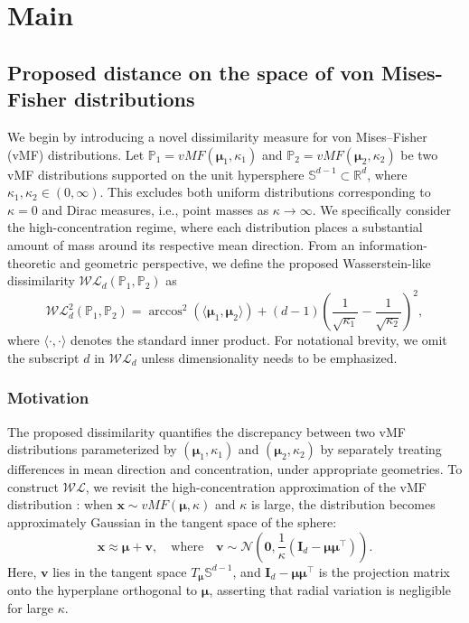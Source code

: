 \documentclass[10pt]{article}
\newcommand{\bfv}{\boldsymbol{v}}
\newcommand{\bfx}{\boldsymbol{x}}
\newcommand{\bfmu}{\boldsymbol{\mu}}
\newcommand{\bfI}{\boldsymbol{I}}
\newcommand{\bbP}{\mathbb{P}}
\newcommand{\bbR}{\mathbb{R}}
\newcommand{\bbS}{\mathbb{S}}
\newcommand{\calN}{\mathcal{N}}
\newcommand{\WL}{\mathcal{WL}}
\begin{document}
\section{Main}
\subsection{Proposed distance on the space of von Mises-Fisher distributions}

We begin by introducing a novel dissimilarity measure for von Mises–Fisher (vMF) distributions. Let $\bbP_1 = vMF(\bfmu_1, \kappa_1)$ and $\bbP_2 = vMF(\bfmu_2, \kappa_2)$ be two vMF distributions supported on the unit hypersphere $\bbS^{d-1} \subset \bbR^d$, where $\kappa_1, \kappa_2 \in (0, \infty)$. This excludes both uniform distributions corresponding to $\kappa=0$ and Dirac measures, i.e., point masses as $\kappa \to \infty$. We specifically consider the high-concentration regime, where each distribution places a substantial amount of mass around its respective mean direction. From an information-theoretic and geometric perspective, we define the proposed Wasserstein-like dissimilarity $\WL_d(\bbP_1, \bbP_2)$ as \begin{equation}\label{def-WL-distance} \WL_d^2(\bbP_1, \bbP_2) = \arccos^2 (\langle \bfmu_1, \bfmu_2 \rangle) + (d-1)\left(\frac{1}{\sqrt{\kappa_1}} - \frac{1}{\sqrt{\kappa_2}}\right)^2, \end{equation} where $\langle \cdot, \cdot \rangle$ denotes the standard inner product. For notational brevity, we omit the subscript $d$ in $\WL_d$ unless dimensionality needs to be emphasized.



\subsubsection{Motivation}


The proposed dissimilarity quantifies the discrepancy between two vMF distributions parameterized by $(\bfmu_1, \kappa_1)$ and $(\bfmu_2, \kappa_2)$ by separately treating differences in mean direction and concentration, under appropriate geometries. To construct $\WL$, we revisit the high-concentration approximation of the vMF distribution \citep{mardia_2000_DirectionalStatistics}: when $\bfx \sim vMF(\bfmu, \kappa)$ and $\kappa$ is large, the distribution becomes approximately Gaussian in the tangent space of the sphere: \begin{equation*} \bfx \approx \bfmu + \bfv, \quad \text{where} \quad \bfv \sim \calN\left(\boldsymbol{0}, \frac{1}{\kappa}(\bfI_d - \bfmu \bfmu^\top)\right). \end{equation*} Here, $\bfv$ lies in the tangent space $T_{\bfmu} \bbS^{d-1}$, and $\bfI_d - \bfmu \bfmu^\top$ is the projection matrix onto the hyperplane orthogonal to $\bfmu$, asserting that radial variation is negligible for large $\kappa$.
\end{document}
